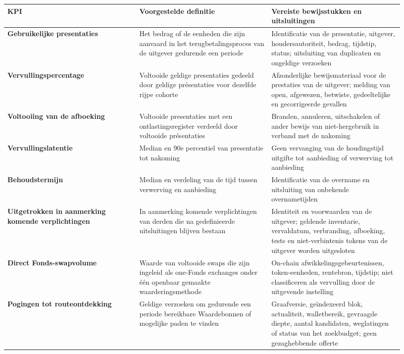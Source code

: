 \documentclass[11pt]{article}
\begin{document}
\begin{longtable}{P{0.31\linewidth} P{0.31\linewidth} P{0.31\linewidth}}
\toprule
KPI & Voorgestelde definitie & Vereiste bewijsstukken en uitsluitingen \\
\midrule
\endhead
\textbf{Gebruikelijke presentaties} & Het bedrag of de eenheden die zijn aanvaard in het terugbetalingsproces van de uitgever gedurende een periode & Identificatie van de presentatie, uitgever, houdersautoriteit, bedrag, tijdstip, status; uitsluiting van duplicaten en ongeldige verzoeken \\
\textbf{Vervullingspercentage} & Voltooide geldige presentaties gedeeld door geldige présentaties voor dezelfde rijpe cohorte & Afzonderlijke bewijsmateriaal voor de prestaties van de uitgever; melding van open, afgewezen, betwiste, gedeeltelijke en gecorrigeerde gevallen \\
\textbf{Voltooiing van de afboeking} & Voltooide presentaties met een ontlastingsregister verdeeld door voltooide présentaties & Branden, annuleren, uitschakelen of ander bewijs van niet-hergebruik in verband met de nakoming \\
\textbf{Vervullingslatentie} & Median en 90e percentiel van presentatie tot nakoming & Geen vervanging van de houdingstijd uitgifte tot aanbieding of verwerving tot aanbieding \\
\textbf{Behoudstermijn} & Median en verdeling van de tijd tussen verwerving en aanbieding & Identificatie van de overname en uitsluiting van onbekende overnametijden \\
\textbf{Uitgetrokken in aanmerking komende verplichtingen} & In aanmerking komende verplichtingen van derden die na gedefinieerde uitsluitingen blijven bestaan & Identiteit en voorwaarden van de uitgever; geldende inventarie, vervaldatum, verbranding, afboeking, tests en niet-verbintenis tokens van de uitgever worden uitgesloten \\
\textbf{Direct Fonds-swapvolume} & Waarde van voltooide swaps die zijn ingeleid als one-Fonds exchanges onder één openbaar gemaakte waarderingsmethode & On-chain afwikkelingsgebeurtenissen, token-eenheden, rentebron, tijdstip; niet classificeren als vervulling door de uitgevende instelling \\
\textbf{Pogingen tot routeontdekking} & Geldige verzoeken om gedurende een periode bereikbare Waardebonnen of mogelijke paden te vinden & Graafversie, geïndexeerd blok, actualiteit, walletbereik, gevraagde diepte, aantal kandidaten, weglatingen of status van het zoekbudget; geen gezaghebbende offerte \\

\end{longtable}
\end{document}
